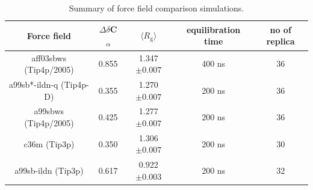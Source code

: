 \documentclass[10pt,letterpaper]{article}
\begin{document}
\begin{table}[!ht]
\centering
\caption{Summary of force field comparison simulations.}
\label{table2}
\begin{tabular}{|c|c|c|c|c|}  
\hline 
Force field & $\Delta$$\delta$C\textsubscript{$\alpha$} &  $\langle R_{\mathrm{g}} \rangle$  & equilibration time & no of replica\\
\hline
aff03sbws (Tip4p/2005) & 0.855 &  1.347 $\pm{0.007}$ & 400 ns & 36\\
\hline
a99sb*-ildn-q (Tip4p-D) & 0.355 &  1.270 $\pm{0.007}$ & 200 ns & 36\\
\hline
a99sbws (Tip4p/2005) & 0.425 &  1.277 $\pm{0.007}$ & 200 ns & 36\\
\hline
c36m (Tip3p)  & 0.350 &  1.306 $\pm{0.007}$ & 200 ns & 30\\
\hline
a99sb-ildn (Tip3p)  & 0.617 &  0.922 $\pm{0.003}$ & 200 ns & 32\\
\hline
\end{tabular}
\end{table}
\end{document}

